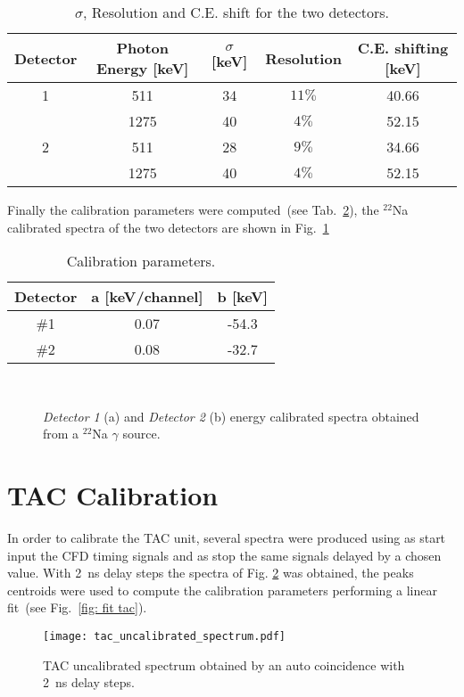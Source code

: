 \begin{table}[h!]
	\centering
	\begin{tabular}{ccccc}
		\toprule
		\toprule
		Detector & Photon Energy [keV] & $\sigma$ [keV] & Resolution & C.E. shifting [keV] \\
		\midrule
		1&511    & 34 & $11\%$ & 40.66 \\
		  &1275 & 40 & $4\%$  & 52.15   \\
		\midrule
		2&511   & 28  & $9\%$& 34.66 \\
		  &1275 & 40 & $4\%$& 52.15  \\
		\bottomrule
		\bottomrule
	\end{tabular}
	\caption{$\sigma$, Resolution and C.E. shift for the two detectors.}
	\label{tab:CEshift}
\end{table}
\newpage
Finally the calibration parameters were computed~(see Tab.~\ref{tab:Cal_par}), the $^{22}$Na  calibrated spectra of the two detectors are shown in Fig.~\ref{fig: calibrated energy spectra}

\begin{table}[h!]
	\centering
	\begin{tabular}{ccc}
		\toprule
		\toprule
		Detector & a [keV/channel] & b [keV] \\
		\midrule
		\#1 &  0.07 & -54.3 \\
		\#2 & 0.08 & -32.7 \\
		\bottomrule
		\bottomrule
	\end{tabular}
	\caption{Calibration parameters.}
	\label{tab:Cal_par}
\end{table}

\begin{figure}[h!]
\centering
{} \quad
{} \\
\caption{\emph{Detector 1} (a) and \emph{Detector 2} (b) energy calibrated spectra  obtained from a $^{22}$Na $\gamma$ source.}
\label{fig: calibrated energy spectra}
\end{figure}

\clearpage
\section*{TAC Calibration}
In order to calibrate the TAC unit, several spectra were produced using as start input the CFD timing signals and as stop the same signals delayed by a chosen value. With 2~ns delay steps the spectra of Fig. \ref{fig: uncalibrated TAC} was obtained, the peaks centroids were used to compute the calibration parameters performing a linear fit~(see Fig.~\ref{fig: fit tac}). 
\begin{figure}[h!]
\centering
\texttt{[image: tac\_uncalibrated\_spectrum.pdf]}
\caption{TAC uncalibrated spectrum obtained by an auto coincidence with 2~ns delay steps. }
\label{fig: uncalibrated TAC}
\end{figure}


